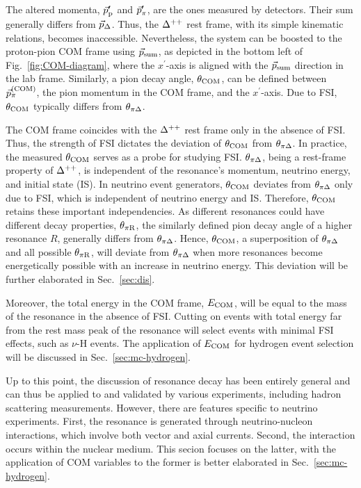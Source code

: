 The altered momenta, $\vec{p}_\textrm{p}^{\prime}$ and $\vec{p}_{\pi}^{\prime}$, are the ones measured by detectors. 
Their sum generally differs from $\vec{p}_{\Delta}$.
Thus, the $\Delta^{++}$ rest frame, with its simple kinematic relations, becomes inaccessible.
Nevertheless, the system can be boosted to the proton-pion COM frame using $\vec{p}_{\textrm{sum}}$, as depicted in the bottom left of Fig.~\ref{fig:COM-diagram}, where the $x^{\prime}$-axis is aligned with the $\vec{p}_{\textrm{sum}}$ direction in the lab frame.
Similarly, a pion decay angle, $\theta_{\textrm{COM}}$, can be defined between $\vec{p}_{\pi}^{(\textrm{COM})}$, the pion momentum in the COM frame, and the $x^{\prime}$-axis.
Due to FSI, $\theta_{\textrm{COM}}$ typically differs from $\theta_{\pi\Delta}$. 

The COM frame coincides with the $\Delta^{++}$ rest frame only in the absence of FSI.
Thus, the strength of FSI dictates the deviation of $\theta_{\textrm{COM}}$ from $\theta_{\pi\Delta}$. 
In practice, the measured $\theta_{\textrm{COM}}$ serves as a probe for studying FSI. 
$\theta_{\pi\Delta}$, being a rest-frame property of $\Delta^{++}$, is independent of the resonance's momentum, neutrino energy, and initial state (IS).
In neutrino event generators, $\theta_{\textrm{COM}}$ deviates from $\theta_{\pi\Delta}$ only due to FSI, which is independent of neutrino energy and IS.
Therefore, $\theta_{\textrm{COM}}$ retains these important independencies.
As different resonances could have different decay properties, $\theta_{\pi\textrm{R}}$, the similarly defined pion decay angle of a higher resonance $R$, generally differs from $\theta_{\pi\Delta}$. 
Hence, $\theta_{\textrm{COM}}$, a superposition of $\theta_{\pi\Delta}$ and all possible $\theta_{\pi\textrm{R}}$, will deviate from $\theta_{\pi\Delta}$ when more resonances become energetically possible with an increase in neutrino energy. 
This deviation will be further elaborated in Sec.~\ref{sec:dis}.

Moreover, the total energy in the COM frame, $E_{\textrm{COM}}$, will be equal to the mass of the resonance in the absence of FSI.
Cutting on events with total energy far from the rest mass peak of the resonance will select events with minimal FSI effects, such as $\nu$-H events. 
The application of $E_{\textrm{COM}}$ for hydrogen event selection will be discussed in Sec.~\ref{sec:mc-hydrogen}.

Up to this point, the discussion of resonance decay has been entirely general and can thus be applied to and validated by various experiments, including hadron scattering measurements. 
However, there are features specific to neutrino experiments. 
First, the resonance is generated through neutrino-nucleon interactions, which involve both vector and axial currents. 
Second, the interaction occurs within the nuclear medium. 
This secion focuses on the latter, with the application of COM variables to the former is better elaborated in Sec.~\ref{sec:mc-hydrogen}.


